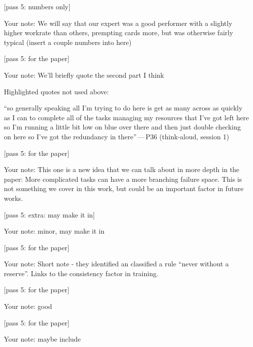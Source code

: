 \begin{options}

 {\footnotesize [pass 5: numbers only]}

\noindent Your note: We will say that our expert was a good performer with a slightly higher workrate than others, prempting cards more, but was otherwise fairly typical (insert a couple numbers into here)

 {\footnotesize [pass 5: for the paper]}

\noindent Your note: We'll briefly quote the second part I think

\noindent Highlighted quotes not used above:\begin{quotelist}
\item ``so generally speaking all I'm trying to do here is get as many across as quickly as I can to complete all of the tasks managing my resources that I've got left here so I'm running a little bit low on blue over there and then just double checking on here so I've got the redundancy in there''\,---\,P36 (think-aloud, session 1)\par{}
\end{quotelist}

 {\footnotesize [pass 5: for the paper]}

\noindent Your note: This one is a new idea that we can talk about in more depth in the paper: More complicated tasks can have a more branching failure space. This is not something we cover in this work, but could be an important factor in future works.

 {\footnotesize [pass 5: extra: may make it in]}

\noindent Your note: minor, may make it in

 {\footnotesize [pass 5: for the paper]}

\noindent Your note: Short note - they identified an classified a rule ``never without a reserve''. Links to the consistency factor in training.

 {\footnotesize [pass 5: for the paper]}

\noindent Your note: good

 {\footnotesize [pass 5: for the paper]}

\noindent Your note: maybe include
\end{options}

\clearpage
